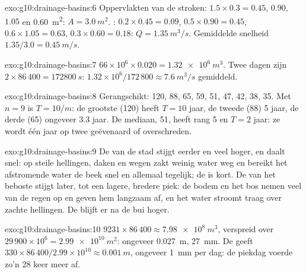 \begin{solution}{exo:g10:drainage-basins:6}
Oppervlakten van de stroken: $1.5 \times 0.3 = 0.45$, $0.90$, $1.05$ en
\qty{0.60}{m^2}: $A = \qty{3.0}{m^2}$. : $0.2 \times 0.45 = 0.09$, $0.5 \times 0.90
= 0.45$, $0.6 \times 1.05 = 0.63$, $0.3 \times 0.60 = 0.18$: $Q =
\qty{1.35}{m^3/s}$. Gemiddelde snelheid $1.35/3.0 = \qty{0.45}{m/s}$.
\end{solution}

\begin{solution}{exo:g10:drainage-basins:7}
$66 \times 10^6 \times 0.020 = \qty{1.32e6}{m^3}$. Twee dagen zijn
$2 \times 86\,400 = \qty{172800}{s}$: $1.32 \times 10^6/172\,800 \approx
\qty{7.6}{m^3/s}$ gemiddeld.
\end{solution}

\begin{solution}{exo:g10:drainage-basins:8}
Gerangschikt: 120, 88, 65, 59, 51, 47, 42, 38, 35. Met $n = 9$ is $T = 10/m$: de
grootste (120) heeft $T = 10$ jaar, de tweede (88) 5 jaar, de derde (65)
ongeveer 3.3 jaar. De mediaan, 51, heeft rang 5 en $T = 2$ jaar: ze wordt één
jaar op twee geëvenaard of overschreden.
\end{solution}

\begin{solution}{exo:g10:drainage-basins:9}
De  van de stad stijgt eerder en veel hoger, en daalt snel: op steile
hellingen, daken en wegen zakt weinig water weg en bereikt het afstromende water
de beek snel en allemaal tegelijk; de  is kort. De  van
het beboste  stijgt later, tot een lagere, bredere piek: de bodem en
het bos nemen veel van de regen op en geven hem langzaam af, en het water stroomt
traag over zachte hellingen. De  blijft er na de bui hoger.
\end{solution}

\begin{solution}{exo:g10:drainage-basins:10}
$9231 \times 86\,400 \approx \qty{7.98e8}{m^3}$, verspreid over
$29\,900 \times 10^6 = \qty{2.99e10}{m^2}$: ongeveer \qty{0.027}{m},
\qty{27}{mm}. De  geeft $330 \times 86\,400/2.99 \times 10^{10}
\approx \qty{0.001}{m}$, ongeveer \qty{1}{mm} per dag: de piekdag voerde zo'n
28 keer meer af.
\end{solution}

